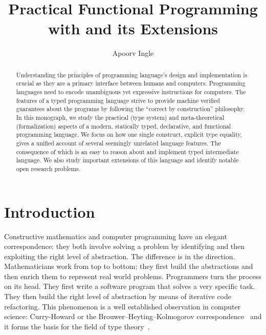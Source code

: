 \documentclass[screen,nonacm,manuscript,review]{acmart} %
\title{Practical Functional Programming with \SFC and its Extensions}
\author{Apoorv Ingle}
\affiliation{%
  \institution{University of Iowa} \department{Department of Computer Science} \streetaddress{McLean Hall} \city{Iowa City} \state{Iowa} \country{USA}}
\begin{document}
\begin{abstract}
  Understanding the principles of programming language's design
  and implementation is crucial as they are a primary interface between humans
  and computers. Programming languages need to encode unambiguous yet
  expressive instructions for computers. The
  features of a typed programming language strive to provide machine
  verified guarantees about the programs by following the  ``correct
  by construction'' philosophy. In this monograph, we study the practical
  (type system) and meta-theoretical (formalization) aspects of a
  modern, statically typed, declarative, and functional
  programming language. We focus on how one single construct,
  explicit type equality, gives a unified account of several seemingly
  unrelated language features. The consequence of which is an easy to
  reason about and implement typed intermediate language. We also
  study important extensions of this language and identify notable open
  research problems.
\end{abstract}

\maketitle
\section{Introduction}\label{sec:introduction}
Constructive mathematics and computer programming have an elegant
correspondence: they both involve solving a problem by
identifying and then exploiting the right level of abstraction.
The difference is in the direction.
Mathematicians work from top to bottom; they first build the abstractions
and then enrich them to represent real world
problems. Programmers turn the process on its head.
They first write a software program that solves a very specific
task. They then build the right level of abstraction by means of
iterative code refactoring. This phenomenon is a well established
observation in computer science: Curry-Howard or the
Brouwer–Heyting–Kolmogorov correspondence~\cite{wadler_propositions_2015,han_deep_2023}
and it forms the basis for the field of type
theory~\cite{barendregt_lambda_2013,hottbook_2013,nordstrom_programming_1990}.
\end{document}
